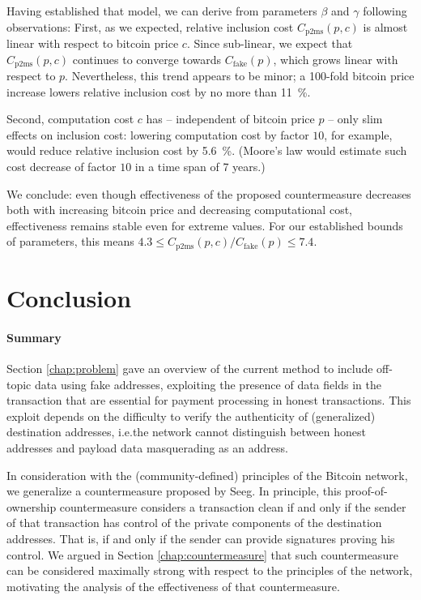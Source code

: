 \documentclass[a4paper,11pt,titlepage]{scrbook}
\begin{document}
Having established that model, we can derive from parameters $\beta$ and $\gamma$ following observations:
First, as we expected, relative inclusion cost $C_\mathrm{p2ms}(p,c)$ is almost linear with respect to bitcoin price $c$.
Since sub-linear, we expect that $C_\mathrm{p2ms}(p,c)$ continues to converge towards $C_\mathrm{fake}(p)$, which grows linear with respect to $p$.
Nevertheless, this trend appears to be minor; a 100-fold bitcoin price increase lowers relative inclusion cost by no more than \SI{11}{\percent}.

Second, computation cost $c$ has – independent of bitcoin price $p$ – only slim effects on inclusion cost: lowering computation cost by factor $10$, for example, would reduce relative inclusion cost by \SI{5.6}{\percent}. (Moore's law would estimate such cost decrease of factor $10$ in a time span of 7 years.)

We conclude: even though effectiveness of the proposed countermeasure decreases both with increasing bitcoin price and decreasing computational cost, effectiveness remains stable even for extreme values.
For our established bounds of parameters, this means $\num{4.3} \leq C_\mathrm{p2ms}(p,c) / C_\mathrm{fake}(p) \leq \num{7.4}$.


\chapter{Conclusion}\label{chap:conclusion}

\subsubsection*{Summary}

Section \ref{chap:problem} gave an overview of the current method to include off-topic data using fake addresses, exploiting the presence of data fields in the transaction that are essential for payment processing in honest transactions.
This exploit depends on the difficulty to verify the authenticity of (generalized) destination addresses, i.e.\@ the network cannot distinguish between honest addresses and payload data masquerading as an address.

In consideration with the (community-defined) principles of the Bitcoin network, we generalize a countermeasure proposed by Seeg.
In principle, this proof-of-ownership countermeasure considers a transaction clean if and only if the sender of that transaction has control of the private components of the destination addresses.
That is, if and only if the sender can provide signatures proving his control.
We argued in Section \ref{chap:countermeasure} that such countermeasure can be considered maximally strong with respect to the principles of the network, motivating the analysis of the effectiveness of that countermeasure.
\end{document}
